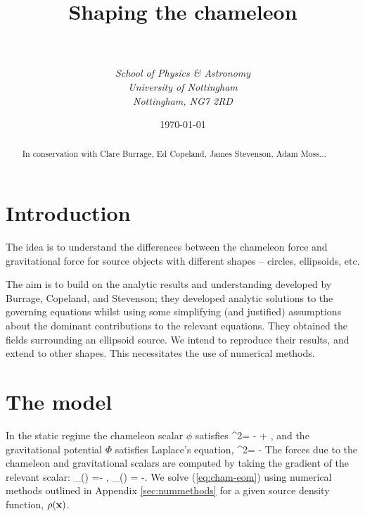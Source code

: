 \documentclass[a4paper, 12pt]{article}
\numberwithin{equation}{section}
\begin{document}
\title{{\bf Shaping the chameleon}}
\author{\\ \\ \it{School of Physics \& Astronomy} \\ \it{University of Nottingham} \\ \it{Nottingham, NG7 2RD}}

\date{\today}



\maketitle
\begin{abstract}
In conservation with Clare Burrage, Ed Copeland, James Stevenson, Adam Moss...
\end{abstract}

\tableofcontents   


\section{Introduction}
The idea is to understand the differences between the chameleon force and gravitational force for source objects with different shapes -- circles, ellipsoids, etc.

The aim is to build on the analytic results and understanding developed by Burrage, Copeland, and Stevenson; they developed analytic solutions to the governing equations whilst using some simplifying (and justified) assumptions about the dominant contributions to the relevant equations. They obtained the fields surrounding an ellipsoid source. We intend to reproduce their results, and extend to other shapes. This necessitates the use of numerical methods.




\section{The model}
In the static regime the chameleon scalar $\phi$ satisfies
\bse
\bea
\label{eq:cham-eom}
\nabla^2\phi = - + ,
\eea
and the gravitational potential $\Phi$ satisfies Laplace's equation,
\bea
\label{eq:laplaceseqn}
\nabla^2\Phi = - \rho
\eea
\ese
The forces due to the chameleon and gravitational scalars are computed by taking the gradient of the relevant scalar:
\bea
\label{eq:forces}
_{(\phi)} =- \nabla\phi,\qquad
{}_{(\Phi)} = -\nabla\Phi.
\eea
We solve (\ref{eq:cham-eom}) using numerical methods outlined in Appendix \ref{sec:nummethods} for a given  source density function, $\rho({\bf{x}})$. 
\end{document}

